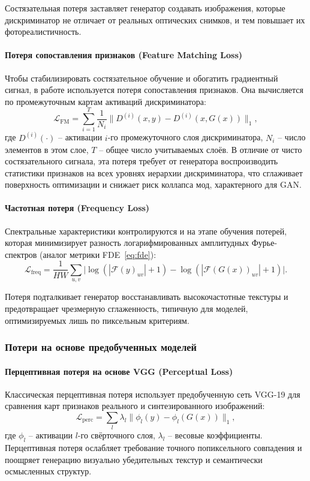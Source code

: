 Состязательная потеря заставляет генератор создавать изображения, которые дискриминатор не отличает от реальных оптических снимков, и тем повышает их фотореалистичность.

\paragraph{Потеря сопоставления признаков (Feature Matching Loss)}
Чтобы стабилизировать состязательное обучение и обогатить градиентный сигнал, в работе используется потеря сопоставления признаков. Она вычисляется по промежуточным картам активаций дискриминатора:
\begin{equation}
\mathcal{L}_{\text{FM}} = \sum_{i=1}^{T} \frac{1}{N_i} \bigl\| D^{(i)}(x, y) - D^{(i)}(x, G(x)) \bigr\|_1,
\label{eq:fm_loss}
\end{equation}
где $D^{(i)}(\cdot)$ -- активации $i$-го промежуточного слоя дискриминатора, $N_i$ -- число элементов в этом слое, $T$ -- общее число учитываемых слоёв.
В отличие от чисто состязательного сигнала, эта потеря требует от генератора воспроизводить статистики признаков на всех уровнях иерархии дискриминатора, что сглаживает поверхность оптимизации и снижает риск коллапса мод, характерного для GAN.

\paragraph{Частотная потеря (Frequency Loss)}
Спектральные характеристики контролируются и на этапе обучения потерей, которая минимизирует разность логарифмированных амплитудных Фурье-спектров (аналог метрики FDE~\eqref{eq:fde}):
\begin{equation}
\mathcal{L}_{\text{freq}} = \frac{1}{HW} \sum_{u,v} \bigl| \log(|\mathcal{F}(y)_{uv}| + 1) - \log(|\mathcal{F}(G(x))_{uv}| + 1) \bigr|.
\label{eq:freq_loss}
\end{equation}

Потеря подталкивает генератор восстанавливать высокочастотные текстуры и предотвращает чрезмерную сглаженность, типичную для моделей, оптимизируемых лишь по пиксельным критериям.

\subsubsection{Потери на основе предобученных моделей}

\paragraph{Перцептивная потеря на основе VGG (Perceptual Loss)}
Классическая перцептивная потеря \cite{johnson2016perceptual} использует предобученную сеть VGG-19 для сравнения карт признаков реального и синтезированного изображений:
\begin{equation}
\mathcal{L}_{\text{perc}} = \sum_{l} \lambda_l \bigl\| \phi_l(y) - \phi_l(G(x)) \bigr\|_1,
\label{eq:perc_loss}
\end{equation}
где $\phi_l$ -- активации $l$-го свёрточного слоя, $\lambda_l$ -- весовые коэффициенты.
Перцептивная потеря ослабляет требование точного попиксельного совпадения и поощряет генерацию визуально убедительных текстур и семантически осмысленных структур.

